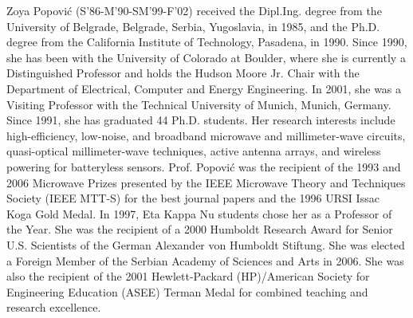 \begin{IEEEbiography}{Zoya Popovi\'c}
(S'86-M'90-SM'99-F'02) received the Dipl.Ing. degree from the University of Belgrade, Belgrade, Serbia, Yugoslavia, in 1985, and the Ph.D. degree from the California Institute of Technology, Pasadena, in 1990.
Since 1990, she has been with the University of Colorado at Boulder, where she is currently a Distinguished Professor and holds the Hudson Moore Jr. Chair with the Department of Electrical, Computer and Energy Engineering. In 2001, she was a Visiting Professor with the Technical University of Munich, Munich, Germany.
Since 1991, she has graduated 44 Ph.D. students. Her research interests include high-efficiency, low-noise, and broadband microwave and millimeter-wave circuits, quasi-optical millimeter-wave techniques, active
antenna arrays, and wireless powering for batteryless sensors.
Prof. Popovi\'c was the recipient of the 1993 and 2006 Microwave Prizes presented by the IEEE Microwave Theory and Techniques Society (IEEE MTT-S) for the best journal papers and the 1996 URSI Issac Koga Gold Medal. In 1997, Eta Kappa Nu students chose her as a Professor of the Year. She was the recipient of a 2000 Humboldt Research Award for Senior U.S. Scientists of the German Alexander von Humboldt Stiftung. She was elected a Foreign Member of the Serbian Academy of Sciences and Arts in 2006. She was also the recipient of the 2001 Hewlett-Packard (HP)/American Society for Engineering Education (ASEE) Terman Medal for combined teaching and research excellence.
\end{IEEEbiography}


